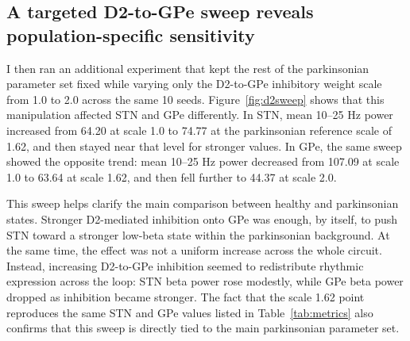 \documentclass[11pt]{article}
\begin{document}
\begin{table}[htbp]
  \centering
  \small
  \caption{Summary metrics from \texttt{summary.json}, averaged across 10 trials per condition. Each simulation lasted 8000 ms, and the first 1000 ms was discarded before spectral analysis.}
  \label{tab:metrics}
\end{table}

\subsection{A targeted D2-to-GPe sweep reveals population-specific sensitivity}
I then ran an additional experiment that kept the rest of the parkinsonian parameter set fixed while varying only the D2-to-GPe inhibitory weight scale from 1.0 to 2.0 across the same 10 seeds. Figure~\ref{fig:d2sweep} shows that this manipulation affected STN and GPe differently. In STN, mean 10--25 Hz power increased from 64.20 at scale 1.0 to 74.77 at the parkinsonian reference scale of 1.62, and then stayed near that level for stronger values. In GPe, the same sweep showed the opposite trend: mean 10--25 Hz power decreased from 107.09 at scale 1.0 to 63.64 at scale 1.62, and then fell further to 44.37 at scale 2.0.

This sweep helps clarify the main comparison between healthy and parkinsonian states. Stronger D2-mediated inhibition onto GPe was enough, by itself, to push STN toward a stronger low-beta state within the parkinsonian background. At the same time, the effect was not a uniform increase across the whole circuit. Instead, increasing D2-to-GPe inhibition seemed to redistribute rhythmic expression across the loop: STN beta power rose modestly, while GPe beta power dropped as inhibition became stronger. The fact that the scale 1.62 point reproduces the same STN and GPe values listed in Table~\ref{tab:metrics} also confirms that this sweep is directly tied to the main parkinsonian parameter set.
\end{document}
